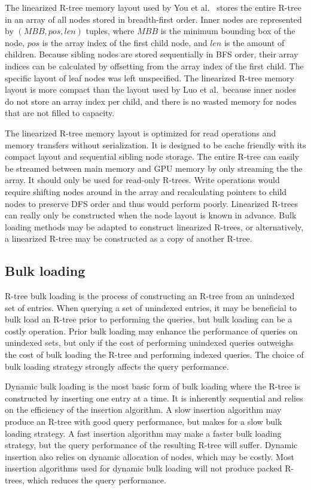 The linearized R-tree memory layout used by You et al.~\cite{you2013parallel} stores the entire R-tree in an array of all nodes stored in breadth-first order. Inner nodes are represented by \((MBB, pos, len)\) tuples, where \(MBB\) is the minimum bounding box of the node, \(pos\) is the array index of the first child node, and \(len\) is the amount of children. Because sibling nodes are stored sequentially in BFS order, their array indices can be calculated by offsetting from the array index of the first child. The specific layout of leaf nodes was left unspecified. The linearized R-tree memory layout is more compact than the layout used by Luo et al.~because inner nodes do not store an array index per child, and there is no wasted memory for nodes that are not filled to capacity.

The linearized R-tree memory layout is optimized for read operations and memory transfers without serialization. It is designed to be cache friendly with its compact layout and sequential sibling node storage. The entire R-tree can easily be streamed between main memory and GPU memory by only streaming the the array. It should only be used for read-only R-trees. Write operations would require shifting nodes around in the array and recalculating pointers to child nodes to preserve DFS order and thus would perform poorly. Linearized R-trees can really only be constructed when the node layout is known in advance. Bulk loading methods may be adapted to construct linearized R-trees, or alternatively, a linearized R-tree may be constructed as a copy of another R-tree.

\subsection{Bulk loading}

R-tree bulk loading is the process of constructing an R-tree from an unindexed set of entries. When querying a set of unindexed entries, it may be beneficial to bulk load an R-tree prior to performing the queries, but bulk loading can be a costly operation. Prior bulk loading may enhance the performance of queries on unindexed sets, but only if the cost of performing unindexed queries outweighs the cost of bulk loading the R-tree and performing indexed queries. The choice of bulk loading strategy strongly affects the query performance.

Dynamic bulk loading is the most basic form of bulk loading where the R-tree is constructed by inserting one entry at a time. It is inherently sequential and relies on the efficiency of the insertion algorithm. A slow insertion algorithm may produce an R-tree with good query performance, but makes for a slow bulk loading strategy. A fast insertion algorithm may make a faster bulk loading strategy, but the query performance of the resulting R-tree will suffer. Dynamic insertion also relies on dynamic allocation of nodes, which may be costly. Most insertion algorithms used for dynamic bulk loading will not produce packed R-trees, which reduces the query performance.

